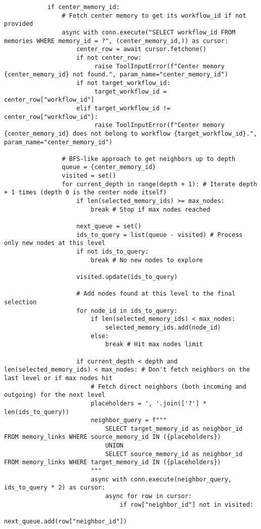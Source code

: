 \documentclass[12pt,a4paper]{article}
\begin{document}
\begin{pageablecode}
\begin{verbatim}
            if center_memory_id:
                # Fetch center memory to get its workflow_id if not provided
                async with conn.execute("SELECT workflow_id FROM memories WHERE memory_id = ?", (center_memory_id,)) as cursor:
                    center_row = await cursor.fetchone()
                    if not center_row:
                         raise ToolInputError(f"Center memory {center_memory_id} not found.", param_name="center_memory_id")
                    if not target_workflow_id:
                         target_workflow_id = center_row["workflow_id"]
                    elif target_workflow_id != center_row["workflow_id"]:
                         raise ToolInputError(f"Center memory {center_memory_id} does not belong to workflow {target_workflow_id}.", param_name="center_memory_id")

                # BFS-like approach to get neighbors up to depth
                queue = {center_memory_id}
                visited = set()
                for current_depth in range(depth + 1): # Iterate depth + 1 times (depth 0 is the center node itself)
                    if len(selected_memory_ids) >= max_nodes: 
                        break # Stop if max nodes reached
                    
                    next_queue = set()
                    ids_to_query = list(queue - visited) # Process only new nodes at this level
                    if not ids_to_query: 
                        break # No new nodes to explore

                    visited.update(ids_to_query)
                    
                    # Add nodes found at this level to the final selection
                    for node_id in ids_to_query:
                        if len(selected_memory_ids) < max_nodes:
                            selected_memory_ids.add(node_id)
                        else:
                            break # Hit max nodes limit

                    if current_depth < depth and len(selected_memory_ids) < max_nodes: # Don't fetch neighbors on the last level or if max nodes hit
                        # Fetch direct neighbors (both incoming and outgoing) for the next level
                        placeholders = ', '.join(['?'] * len(ids_to_query))
                        neighbor_query = f"""
                            SELECT target_memory_id as neighbor_id FROM memory_links WHERE source_memory_id IN ({placeholders})
                            UNION
                            SELECT source_memory_id as neighbor_id FROM memory_links WHERE target_memory_id IN ({placeholders})
                        """
                        async with conn.execute(neighbor_query, ids_to_query * 2) as cursor:
                            async for row in cursor:
                                if row["neighbor_id"] not in visited:
                                     next_queue.add(row["neighbor_id"])


\end{verbatim}
\end{pageablecode}
\end{document}
